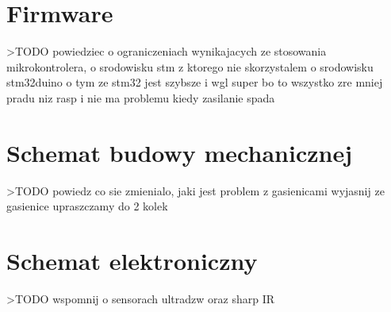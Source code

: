 \section{Firmware}
>TODO powiedziec o ograniczeniach wynikajacych ze stosowania
mikrokontrolera, o srodowisku stm z ktorego nie skorzystalem
o srodowisku stm32duino o tym ze stm32 jest szybsze i wgl
super bo to wszystko zre mniej pradu niz rasp i nie ma problemu kiedy zasilanie spada

\section{Schemat budowy mechanicznej}
>TODO powiedz co sie zmienialo, jaki jest problem z gasienicami
wyjasnij ze gasienice upraszczamy do 2 kolek

\section{Schemat elektroniczny}
>TODO wspomnij o sensorach ultradzw oraz sharp IR